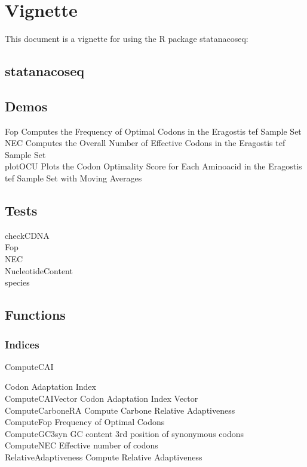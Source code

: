\chapter{Vignette}
This document is a vignette for using the R package statanacoseq:


\section{statanacoseq}


\section{Demos}
Fop \quad Computes the Frequency of Optimal Codons in the Eragostis tef Sample Set \\
NEC \quad Computes the Overall Number of Effective Codons in the Eragostis tef Sample Set \\
plotOCU \quad Plots the Codon Optimality Score for Each Aminoacid in the Eragostis tef Sample Set with Moving Averages \\


\section{Tests}
checkCDNA \quad \\
Fop \quad \\
NEC \quad \\
NucleotideContent \quad \\
species \quad \\

\section{Functions}

\subsection{Indices}
\hypertarget{function:CAI}{ComputeCAI}	\quad Codon Adaptation Index \\
ComputeCAIVector \quad 	Codon Adaptation Index Vector \\
ComputeCarboneRA	\quad Compute Carbone Relative Adaptiveness \\
\hypertarget{function:Fop}{ComputeFop}	\quad Frequency of Optimal Codons \\
\hypertarget{function:G3C}{ComputeGC3syn}	\quad GC content 3rd position of synonymous codons	 \\	%
\hypertarget{function:NEC}{ComputeNEC}	\quad Effective number of codons \\							%
\hypertarget{function:RA}{RelativeAdaptiveness}	\quad Compute Relative Adaptiveness	 \\			%

